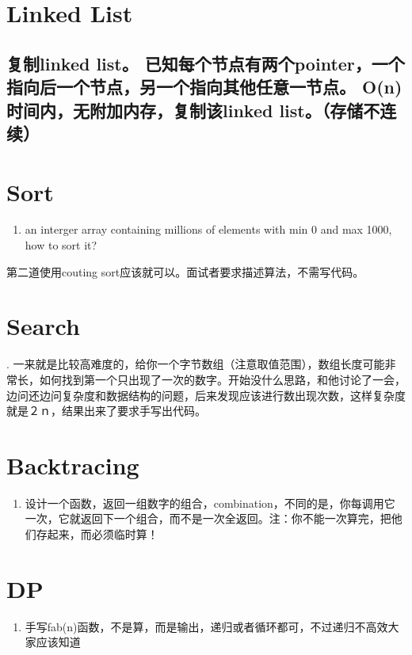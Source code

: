 \documentclass[12pt]{book}
\begin{document}
\chapter{Linked List}
\label{sec-3}
\section{复制linked list。 已知每个节点有两个pointer，一个指向后一个节点，另一个指向其他任意一节点。 O(n)时间内，无附加内存，复制该linked list。（存储不连续）}
\label{sec-3-1}

\chapter{Sort}
\label{sec-4}
\begin{enumerate}
\item an interger array containing millions of elements with min 0 and max 1000, how to sort it?
\end{enumerate}

第二道使用couting sort应该就可以。面试者要求描述算法，不需写代码。

\chapter{Search}
\label{sec-5}
. 一来就是比较高难度的，给你一个字节数组（注意取值范围），数组长度可能非常长，如何找到第一个只出现了一次的数字。开始没什么思路，和他讨论了一会，边问还边问复杂度和数据结构的问题，后来发现应该进行数出现次数，这样复杂度就是２ｎ，结果出来了要求手写出代码。

\chapter{Backtracing}
\label{sec-6}
\begin{enumerate}
\item 设计一个函数，返回一组数字的组合，combination，不同的是，你每调用它一次，它就返回下一个组合，而不是一次全返回。注：你不能一次算完，把他们存起来，而必须临时算！
\end{enumerate}

\chapter{DP}
\label{sec-7}
\begin{enumerate}
\item 手写fab(n)函数，不是算，而是输出，递归或者循环都可，不过递归不高效大家应该知道
\end{enumerate}
\end{document}
